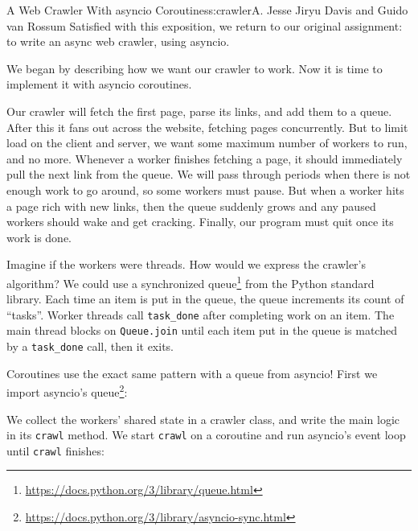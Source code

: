 \begin{aosachapter}{A Web Crawler With asyncio Coroutines}{s:crawler}{A. Jesse Jiryu Davis and Guido van Rossum}
Satisfied with this exposition, we return to our original assignment: to
write an async web crawler, using asyncio.

\label{coordinating-coroutines}

We began by describing how we want our crawler to work. Now it is time
to implement it with asyncio coroutines.

Our crawler will fetch the first page, parse its links, and add them to
a queue. After this it fans out across the website, fetching pages
concurrently. But to limit load on the client and server, we want some
maximum number of workers to run, and no more. Whenever a worker
finishes fetching a page, it should immediately pull the next link from
the queue. We will pass through periods when there is not enough work to
go around, so some workers must pause. But when a worker hits a page
rich with new links, then the queue suddenly grows and any paused
workers should wake and get cracking. Finally, our program must quit
once its work is done.

Imagine if the workers were threads. How would we express the crawler's
algorithm? We could use a synchronized queue\footnote{\url{https://docs.python.org/3/library/queue.html}}
from the Python standard library. Each time an item is put in the queue,
the queue increments its count of ``tasks''. Worker threads call
\texttt{task\_done} after completing work on an item. The main thread
blocks on \texttt{Queue.join} until each item put in the queue is
matched by a \texttt{task\_done} call, then it exits.

Coroutines use the exact same pattern with a queue from asyncio! First
we import asyncio's queue\footnote{\url{https://docs.python.org/3/library/asyncio-sync.html}}:

\begin{Shaded}
\begin{Highlighting}[]
\NormalTok{:}
       
 \NormalTok{:}
      
\end{Highlighting}
\end{Shaded}

We collect the workers' shared state in a crawler class, and write the
main logic in its \texttt{crawl} method. We start \texttt{crawl} on a
coroutine and run asyncio's event loop until \texttt{crawl} finishes:


\end{aosachapter}

